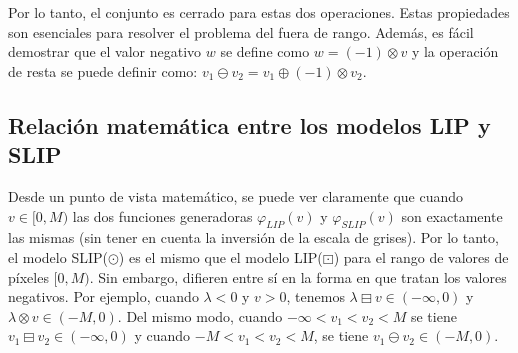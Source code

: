 Por lo tanto, el conjunto es cerrado para estas dos operaciones. Estas propiedades son esenciales para resolver el problema del fuera de rango. Además, es fácil demostrar que el valor negativo $w$ se define como $w = (-1)\otimes v$ y la operación de resta se puede definir como: $v_1\ominus v_2=v_1\oplus(-1)\otimes v_2$.

\subsection{Relación matemática entre los modelos LIP y SLIP}

Desde un punto de vista matemático, se puede ver claramente que cuando $v \in [0, M)$ las dos funciones generadoras $\varphi_{LIP}(v)$ y $\varphi_{SLIP}(v)$ son exactamente las mismas (sin tener en cuenta la inversi\'on de la escala de grises). Por lo tanto, el modelo SLIP($\odot$) es el mismo que el modelo LIP($\boxdot$) para el rango de valores de píxeles $[0, M)$. Sin embargo, difieren entre sí en la forma en que tratan los valores negativos.  Por ejemplo, cuando $\lambda < 0$ y $v > 0$, tenemos $\lambda\boxminus v \in (-\infty, 0)$ y $\lambda \otimes v \in (-M, 0)$. Del mismo modo, cuando $-\infty < v_1 < v_2 < M$ se tiene $v_1 \boxminus v_2 \in (-\infty, 0)$ y cuando $-M < v_1 < v_2 < M$, se tiene $v_1\ominus v_2 \in (-M, 0)$. 
